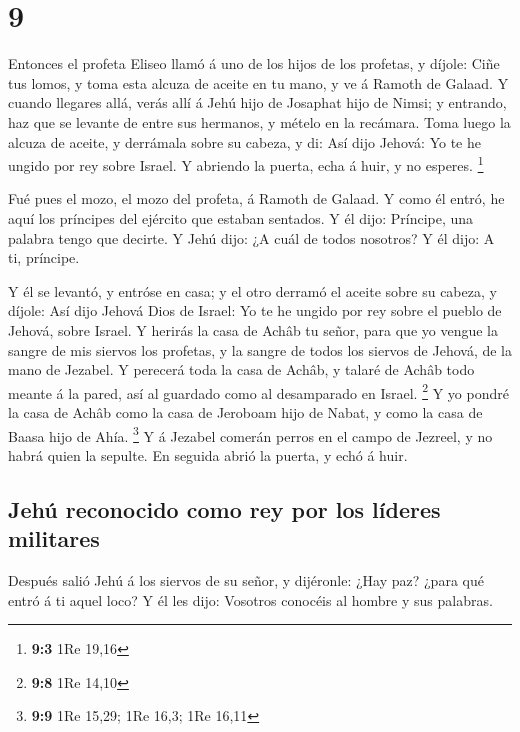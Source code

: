 \hypertarget{section-8}{%
\section{9}\label{section-8}}

 Entonces el profeta Eliseo llamó á uno de los hijos de los
profetas, y díjole: Ciñe tus lomos, y toma esta alcuza de aceite en tu
mano, y ve á Ramoth de Galaad.  Y cuando llegares allá,
verás allí á Jehú hijo de Josaphat hijo de Nimsi; y entrando, haz que se
levante de entre sus hermanos, y mételo en la recámara. 
Toma luego la alcuza de aceite, y derrámala sobre su cabeza, y di: Así
dijo Jehová: Yo te he ungido por rey sobre Israel. Y abriendo la puerta,
echa á huir, y no esperes. \footnote{\textbf{9:3} 1Re 19,16}

 Fué pues el mozo, el mozo del profeta, á Ramoth de Galaad.
 Y como él entró, he aquí los príncipes del ejército que
estaban sentados. Y él dijo: Príncipe, una palabra tengo que decirte. Y
Jehú dijo: ¿A cuál de todos nosotros? Y él dijo: A ti, príncipe.

 Y él se levantó, y entróse en casa; y el otro derramó el
aceite sobre su cabeza, y díjole: Así dijo Jehová Dios de Israel: Yo te
he ungido por rey sobre el pueblo de Jehová, sobre Israel. 
Y herirás la casa de Achâb tu señor, para que yo vengue la sangre de mis
siervos los profetas, y la sangre de todos los siervos de Jehová, de la
mano de Jezabel.  Y perecerá toda la casa de Achâb, y talaré
de Achâb todo meante á la pared, así al guardado como al desamparado en
Israel. \footnote{\textbf{9:8} 1Re 14,10}  Y yo pondré la
casa de Achâb como la casa de Jeroboam hijo de Nabat, y como la casa de
Baasa hijo de Ahía. \footnote{\textbf{9:9} 1Re 15,29; 1Re 16,3; 1Re
  16,11}  Y á Jezabel comerán perros en el campo de
Jezreel, y no habrá quien la sepulte. En seguida abrió la puerta, y echó
á huir.

\hypertarget{jehuxfa-reconocido-como-rey-por-los-luxedderes-militares}{%
\subsection{Jehú reconocido como rey por los líderes
militares}\label{jehuxfa-reconocido-como-rey-por-los-luxedderes-militares}}

 Después salió Jehú á los siervos de su señor, y dijéronle:
¿Hay paz? ¿para qué entró á ti aquel loco? Y él les dijo: Vosotros
conocéis al hombre y sus palabras.

